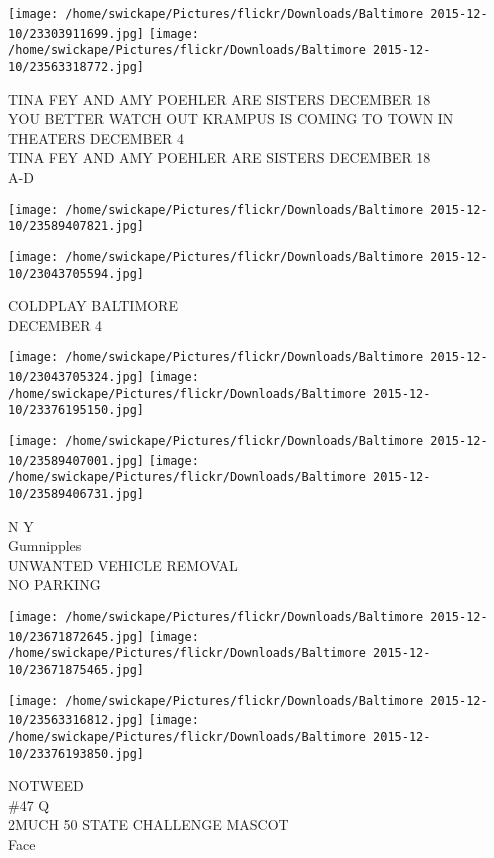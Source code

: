 \documentclass[10pt,letterpaper]{article}
\begin{document}
\texttt{[image: /home/swickape/Pictures/flickr/Downloads/Baltimore 2015-12-10/23303911699.jpg]}
\texttt{[image: /home/swickape/Pictures/flickr/Downloads/Baltimore 2015-12-10/23563318772.jpg]}

TINA FEY AND AMY POEHLER ARE SISTERS DECEMBER 18\\
YOU BETTER WATCH OUT KRAMPUS IS COMING TO TOWN IN THEATERS DECEMBER 4\\
TINA FEY AND AMY POEHLER ARE SISTERS DECEMBER 18\\
A{-}D
\pagebreak

\texttt{[image: /home/swickape/Pictures/flickr/Downloads/Baltimore 2015-12-10/23589407821.jpg]}

\vspace{0.25in}
\texttt{[image: /home/swickape/Pictures/flickr/Downloads/Baltimore 2015-12-10/23043705594.jpg]}

COLDPLAY BALTIMORE\\
DECEMBER 4
\pagebreak

\texttt{[image: /home/swickape/Pictures/flickr/Downloads/Baltimore 2015-12-10/23043705324.jpg]}
\texttt{[image: /home/swickape/Pictures/flickr/Downloads/Baltimore 2015-12-10/23376195150.jpg]}

\texttt{[image: /home/swickape/Pictures/flickr/Downloads/Baltimore 2015-12-10/23589407001.jpg]}
\texttt{[image: /home/swickape/Pictures/flickr/Downloads/Baltimore 2015-12-10/23589406731.jpg]}

N Y\\
Gumnipples\\
UNWANTED VEHICLE REMOVAL\\
NO PARKING
\pagebreak

\texttt{[image: /home/swickape/Pictures/flickr/Downloads/Baltimore 2015-12-10/23671872645.jpg]}
\texttt{[image: /home/swickape/Pictures/flickr/Downloads/Baltimore 2015-12-10/23671875465.jpg]}

\texttt{[image: /home/swickape/Pictures/flickr/Downloads/Baltimore 2015-12-10/23563316812.jpg]}
\texttt{[image: /home/swickape/Pictures/flickr/Downloads/Baltimore 2015-12-10/23376193850.jpg]}

NOTWEED\\
\#47 Q\\
2MUCH 50 STATE CHALLENGE MASCOT\\
Face
\pagebreak
\end{document}

